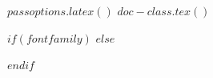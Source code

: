 %
%
%
%
%
%
%
$passoptions.latex()$
%
$doc-class.tex()$

\usepackage{iftex}
\ifPDFTeX
  \usepackage[utf8]{inputenc}
  \usepackage[$if(fontenc)$$fontenc$$else$T1$endif$]{fontenc}
\fi

\usepackage{xifthen}

$if(fontfamily)$
$else$
\ifPDFTeX
  \usepackage[default]{raleway}
\fi
$endif$
\renewcommand*\familydefault{\sfdefault}

